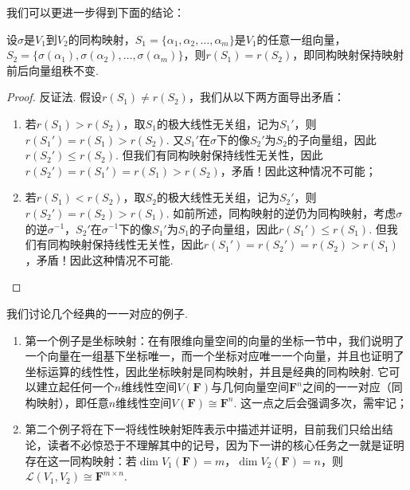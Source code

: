 \begin{enumerate}
          我们可以更进一步得到下面的结论：
          \begin{theorem}\label{thm:6:同构保秩}
              设$\sigma$是$V_1$到$V_2$的同构映射，$S_1=\{\alpha_1,\alpha_2,\ldots,\alpha_m\}$是$V_1$的任意一组向量，$S_2=\{\sigma(\alpha_1),\sigma(\alpha_2),\ldots,\sigma(\alpha_m)\}$，则$r(S_1)=r(S_2)$，即同构映射保持映射前后向量组秩不变.
          \end{theorem}
          \begin{proof}
              反证法. 假设$r(S_1)\neq r(S_2)$，我们从以下两方面导出矛盾：
              \begin{enumerate}
                  \item 若$r(S_1)>r(S_2)$，取$S_1$的极大线性无关组，记为$S_1'$，则$r(S_1')=r(S_1)>r(S_2)$. 又$S_1'$在$\sigma$下的像$S_2'$为$S_2$的子向量组，因此$r(S_2')\leqslant r(S_2)$. 但我们有同构映射保持线性无关性，因此$r(S_2')=r(S_1')=r(S_1)>r(S_2)$，矛盾！因此这种情况不可能；

                  \item 若$r(S_1)<r(S_2)$，取$S_2$的极大线性无关组，记为$S_2'$，则$r(S_2')=r(S_2)>r(S_1)$. 如前所述，同构映射的逆仍为同构映射，考虑$\sigma$的逆$\sigma^{-1}$，$S_2'$在$\sigma^{-1}$下的像$S_1'$为$S_1$的子向量组，因此$r(S_1')\leqslant r(S_1)$. 但我们有同构映射保持线性无关性，因此$r(S_1')=r(S_2')=r(S_2)>r(S_1)$，矛盾！因此这种情况不可能.
              \end{enumerate}
          \end{proof}
\end{enumerate}

我们讨论几个经典的一一对应的例子.
\begin{enumerate}
    \item 第一个例子是坐标映射：在有限维向量空间的向量的坐标一节中，我们说明了一个向量在一组基下坐标唯一，而一个坐标对应唯一一个向量，并且也证明了坐标运算的线性性，因此坐标映射是同构映射，并且是经典的同构映射. 它可以建立起任何一个$n$维线性空间$V(\mathbf{F})$与几何向量空间$\mathbf{F}^n$之间的一一对应（同构映射），即任意$n$维线性空间$V(\mathbf{F})\cong\mathbf{F}^n$. 这一点之后会强调多次，需牢记；

    \item 第二个例子将在下一将线性映射矩阵表示中描述并证明，目前我们只给出结论，读者不必惊恐于不理解其中的记号，因为下一讲的核心任务之一就是证明存在这一同构映射：若$\dim V_1(\mathbf{F})=m$，$\dim V_2(\mathbf{F})=n$，则$\mathcal{L}(V_1,V_2) \cong \mathbf{F}^{m \times n}$.
\end{enumerate}


